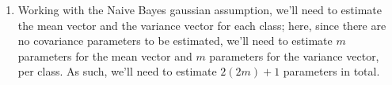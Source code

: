 \documentclass[12pt]{article}
\begin{document}
\begin{enumerate}[leftmargin=\labelsep]
\begin{enumerate}
{\begin{enumerate}
{                        need to estimate $2(m + \frac{m(m+1)}{2}) + 1$ parameters in total.
                        }
                  \item {
                        Working with the Naive Bayes gaussian assumption, we'll need to estimate
                        the mean vector and the variance vector for each class; here, since
                        there are no covariance parameters to be estimated, we'll need to
                        estimate $m$ parameters for the mean vector and $m$ parameters for the
                        variance vector, per class. As such, we'll need to estimate $2(2m) + 1$
                        parameters in total.
                        }
                \end{enumerate}
                }
        \end{enumerate}

\end{enumerate}
\end{document}

